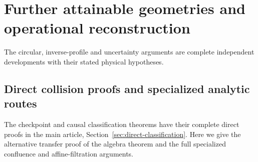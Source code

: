 \section{Further attainable geometries and operational reconstruction}
\label{app:additional-geometry}
The circular, inverse-profile and uncertainty arguments are complete
independent developments with their stated physical hypotheses.
\begingroup
\let\section\subsection
\let\subsection\subsubsection
\let\subsubsection\paragraph




\endgroup
\section{Direct collision proofs and specialized analytic routes}
\label{app:complete-routes}
The checkpoint and causal classification theorems have their complete
direct proofs in the main article, Section~\ref{sec:direct-classification}.
Here we give the alternative transfer proof of the algebra theorem and
the full specialized confluence and affine-filtration arguments.

\begingroup
\let\section\subsection
\let\subsection\subsubsection
\let\subsubsection\paragraph



\endgroup
